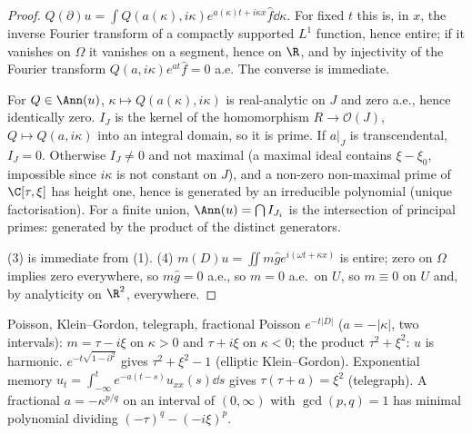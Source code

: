 \begin{proof}
$Q(\partial)u=\int Q(a(\kappa),i\kappa)e^{a(\kappa)t+i\kappa x}\hat f\dd\kappa$. For fixed $t$ this is, in $x$, the inverse Fourier transform of a compactly supported $L^1$ function, hence entire; if it vanishes on $\Omega$ it vanishes on a segment, hence on $\R$, and by injectivity of the Fourier transform $Q(a,i\kappa)e^{at}\hat f=0$ a.e. The converse is immediate.

For $Q\in\Ann(u)$, $\kappa\mapsto Q(a(\kappa),i\kappa)$ is real-analytic on $J$ and zero a.e., hence identically zero. $I_J$ is the kernel of the homomorphism $R\to\mathcal O(J)$, $Q\mapsto Q(a,i\kappa)$ into an integral domain, so it is prime. If $a|_J$ is transcendental, $I_J=0$. Otherwise $I_J\ne0$ and not maximal (a maximal ideal contains $\xi-\xi_0$, impossible since $i\kappa$ is not constant on $J$), and a non-zero non-maximal prime of $\C[\tau,\xi]$ has height one, hence is generated by an irreducible polynomial (unique factorisation). For a finite union, $\Ann(u)=\bigcap I_{J_i}$ is the intersection of principal primes: generated by the product of the distinct generators.

(3) is immediate from (1). (4) $m(D)u=\iint m\hat ge^{i(\omega t+\kappa x)}$ is entire; zero on $\Omega$ implies zero everywhere, so $m\hat g=0$ a.e., so $m=0$ a.e.\ on $U$, so $m\equiv0$ on $U$ and, by analyticity on $\R^2$, everywhere.

\end{proof}

\begin{example}{Poisson, Klein--Gordon, telegraph, fractional}
Poisson $e^{-t|D|}$ ($a=-|\kappa|$, two intervals): $m=\tau-i\xi$ on $\kappa>0$ and $\tau+i\xi$ on $\kappa<0$; the product $\tau^2+\xi^2$: $u$ is harmonic. $e^{-t\sqrt{1-\partial^2}}$ gives $\tau^2+\xi^2-1$ (elliptic Klein--Gordon). Exponential memory $u_t=\int_{-\infty}^te^{-a(t-s)}u_{xx}(s)\dd s$ gives $\tau(\tau+a)=\xi^2$ (telegraph). A fractional $a=-\kappa^{p/q}$ on an interval of $(0,\infty)$ with $\gcd(p,q)=1$ has minimal polynomial dividing $(-\tau)^q-(-i\xi)^p$.
\end{example}

